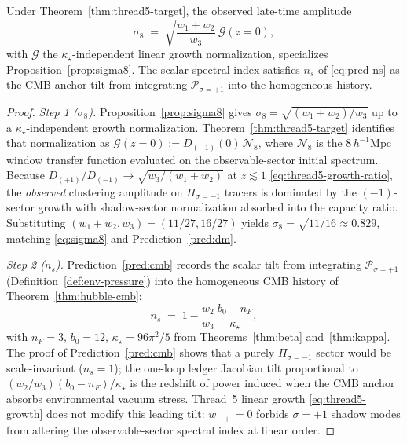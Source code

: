 \begin{proposition}
\label{prop:thread5-ledger}
Under Theorem~\ref{thm:thread5-target}, the observed late-time amplitude
\begin{equation}\label{eq:thread5-sigma8}
  \sigma_8
  \;=\;
  \sqrt{\frac{w_1+w_2}{w_3}}\,
  \mathcal{G}(z\!=\!0),
\end{equation}
with $\mathcal{G}$ the $\kappa_\star$-independent linear growth normalization,
specializes Proposition~\ref{prop:sigma8}. The scalar spectral index satisfies
$n_s$ of \eqref{eq:pred-ns} as the CMB-anchor tilt from integrating
$\mathcal{P}_{\sigma=+1}$ into the homogeneous history.
\end{proposition}

\begin{proof}
\emph{Step 1 ($\sigma_8$).}
Proposition~\ref{prop:sigma8} gives
$\sigma_8=\sqrt{(w_1+w_2)/w_3}$ up to a $\kappa_\star$-independent growth
normalization. Theorem~\ref{thm:thread5-target} identifies that
normalization as $\mathcal{G}(z=0):=D_{(-1)}(0)\,\mathcal{N}_8$, where
$\mathcal{N}_8$ is the $8\,h^{-1}\mathrm{Mpc}$ window transfer function
evaluated on the observable-sector initial spectrum. Because
$D_{(+1)}/D_{(-1)}\to\sqrt{w_3/(w_1+w_2)}$ at $z\lesssim 1$
\eqref{eq:thread5-growth-ratio}, the \emph{observed} clustering amplitude on
$\Pi_{\sigma=-1}$ tracers is dominated by the $(-1)$-sector growth with
shadow-sector normalization absorbed into the capacity ratio. Substituting
$(w_1+w_2,w_3)=(11/27,16/27)$ yields
$\sigma_8=\sqrt{11/16}\approx 0.829$, matching \eqref{eq:sigma8} and
Prediction~\ref{pred:dm}.

\emph{Step 2 ($n_s$).}
Prediction~\ref{pred:cmb} records the scalar tilt from integrating
$\mathcal{P}_{\sigma=+1}$ (Definition~\ref{def:env-pressure}) into the
homogeneous CMB history of Theorem~\ref{thm:hubble-cmb}:
\begin{equation}\label{eq:thread5-ns-proof}
  n_s
  \;=\;
  1
  -
  \frac{w_2}{w_3}\,
  \frac{b_0-n_F}{\kappa_\star},
\end{equation}
with $n_F=3$, $b_0=12$, $\kappa_\star=96\pi^2/5$ from Theorems~\ref{thm:beta}
and~\ref{thm:kappa}. The proof of Prediction~\ref{pred:cmb} shows that a
purely $\Pi_{\sigma=-1}$ sector would be scale-invariant ($n_s=1$); the
one-loop ledger Jacobian tilt proportional to $(w_2/w_3)(b_0-n_F)/\kappa_\star$
is the redshift of power induced when the CMB anchor absorbs environmental
vacuum stress. Thread~5 linear growth \eqref{eq:thread5-growth} does not
modify this leading tilt: $w_{-+}=0$ forbids $\sigma=+1$ shadow modes from
altering the observable-sector spectral index at linear order.
\end{proof}

